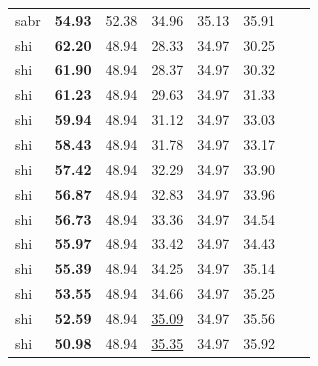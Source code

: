 \begin{tabular}{llcccccc}
sabr & \textbf{54.93} & 52.38 & 34.96 & 35.13 & 35.91 & \\
shi & \textbf{62.20} & 48.94 & 28.33 & 34.97 & 30.25 & \\
shi & \textbf{61.90} & 48.94 & 28.37 & 34.97 & 30.32 & \\
shi & \textbf{61.23} & 48.94 & 29.63 & 34.97 & 31.33 & \\
shi & \textbf{59.94} & 48.94 & 31.12 & 34.97 & 33.03 & \\
shi & \textbf{58.43} & 48.94 & 31.78 & 34.97 & 33.17 & \\
shi & \textbf{57.42} & 48.94 & 32.29 & 34.97 & 33.90 & \\
shi & \textbf{56.87} & 48.94 & 32.83 & 34.97 & 33.96 & \\
shi & \textbf{56.73} & 48.94 & 33.36 & 34.97 & 34.54 & \\
shi & \textbf{55.97} & 48.94 & 33.42 & 34.97 & 34.43 & \\
shi & \textbf{55.39} & 48.94 & 34.25 & 34.97 & 35.14 & \\
shi & \textbf{53.55} & 48.94 & 34.66 & 34.97 & 35.25 & \\
shi & \textbf{52.59} & 48.94 & \underline{35.09} & 34.97 & 35.56 & \\
shi & \textbf{50.98} & 48.94 & \underline{35.35} & 34.97 & 35.92 & \\
\bottomrule
\end{tabular}